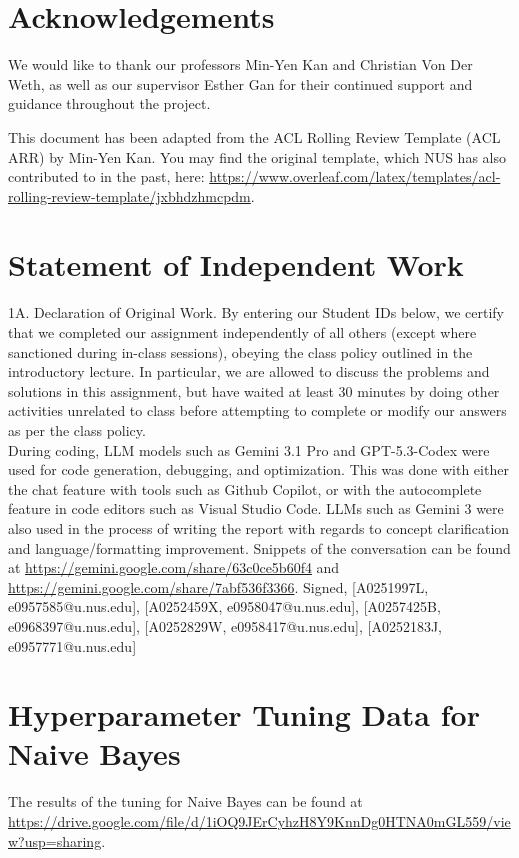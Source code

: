 \documentclass[11pt]{article}
\begin{document}
\clearpage




\section*{Acknowledgements}
We would like to thank our professors Min-Yen Kan and Christian Von Der Weth, as well as our supervisor Esther Gan for their continued support and guidance throughout the project.

This document has been adapted from the ACL Rolling Review Template (ACL ARR) by Min-Yen Kan.  You may find the original template, which NUS has also contributed to in the past, here: \url{https://www.overleaf.com/latex/templates/acl-rolling-review-template/jxbhdzhmcpdm}.

\section*{Statement of Independent Work}

\noindent 1A. Declaration of Original Work. By entering our Student IDs below, we certify that we completed our assignment independently of all others (except where sanctioned during in-class sessions), obeying the class policy outlined in the introductory lecture. In particular, we are allowed to discuss the problems and solutions in this assignment, but have waited at least 30 minutes by doing other activities unrelated to class before attempting to complete or modify our answers as per the class policy. \\
During coding, LLM models such as Gemini 3.1 Pro and GPT-5.3-Codex were used for code generation, debugging, and optimization. This was done with either the chat feature with tools such as Github Copilot, or with the autocomplete feature in code editors such as Visual Studio Code.
LLMs such as Gemini 3 were also used in the process of writing the report with regards to concept clarification and language/formatting improvement. Snippets of the conversation can be found at \url{https://gemini.google.com/share/63c0ce5b60f4} and \url{https://gemini.google.com/share/7abf536f3366}. 
\noindent Signed, 
[A0251997L, e0957585@u.nus.edu],
[A0252459X, e0958047@u.nus.edu],
[A0257425B, e0968397@u.nus.edu],
[A0252829W, e0958417@u.nus.edu],
[A0252183J, e0957771@u.nus.edu]

\appendix

\section{Hyperparameter Tuning Data for Naive Bayes}
The results of the tuning for Naive Bayes can be found at \url{https://drive.google.com/file/d/1iOQ9JErCyhzH8Y9KnnDg0HTNA0mGL559/view?usp=sharing}.
\end{document}

